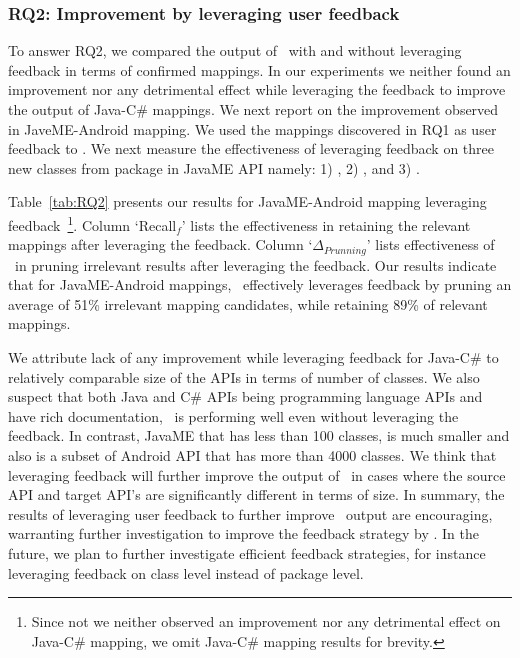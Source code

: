 \subsubsection{RQ2: Improvement by leveraging user feedback}

To answer RQ2, we compared the output of \tool\ with and without leveraging feedback in terms of confirmed mappings.
In our experiments we neither found an improvement nor any detrimental effect while leveraging the feedback to improve the output of Java-C\# mappings.
We next report on the improvement observed in JaveME-Android mapping.
We used the mappings discovered in RQ1 as user feedback to \tool.
We next measure the effectiveness of leveraging feedback on three new classes 
from  package in JavaME API namely: 1) , 2) , and 3) .

Table~\ref{tab:RQ2} presents our results for JavaME-Android mapping leveraging feedback~\footnote{Since not we neither observed an improvement nor any detrimental effect on Java-C\# mapping, we omit Java-C\# mapping results for brevity.}.
Column `Recall$_f$' lists the effectiveness in retaining the relevant mappings after leveraging the feedback. Column `$\Delta_{Prunning}$' lists effectiveness of \tool\ in pruning irrelevant results after leveraging the feedback.
Our results indicate that for JavaME-Android mappings, \tool\ effectively leverages feedback by pruning an average of 51\% irrelevant mapping candidates, while retaining 89\% of relevant mappings.  

We attribute lack of any improvement while leveraging feedback for Java-C\# to relatively comparable size of the APIs in terms of number of classes. We also suspect that both Java and C\# APIs being programming language APIs and have rich documentation, \tool\ is performing well even without leveraging the feedback. In contrast, JavaME that has less than 100 classes, is much smaller and also is a subset of Android API that has more than 4000 classes. We think that leveraging feedback will further improve the output of \tool\ in cases where the source API and target API's are significantly different in terms of size. In summary, the results of leveraging user feedback to further improve \tool\ output are encouraging, warranting further investigation to improve the feedback strategy by \tool. In the future, we plan to further investigate efficient feedback strategies, for instance leveraging feedback on class level instead of package level.


